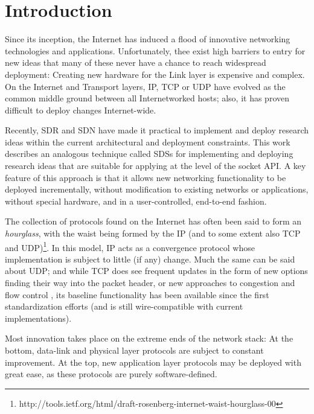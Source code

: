 \section{Introduction}

Since its inception, the Internet has induced a flood of innovative
networking technologies and applications. 
Unfortunately, thee exist high barriers to entry for 
new ideas that many of these never have a chance to reach widespread 
deployment: 
Creating new hardware for the Link layer is expensive and complex. 
On the Internet and Transport layers, \ac{IP}, \ac{TCP} or \ac{UDP} 
have evolved as the common middle ground between all Internetworked hosts; 
also, it has proven difficult to deploy changes Internet-wide.

Recently, \ac{SDR} and \ac{SDN} have made it practical to implement 
and deploy research ideas within the current architectural and 
deployment constraints.
This work describes an analogous technique called 
\acfp{SDS} for implementing and deploying research ideas 
that are suitable for applying at the level of the socket \ac{API}.
A key feature of this approach is that it 
allows new networking functionality to be deployed incrementally,  
without modification to existing networks or applications, 
without special hardware, %
and in a user-controlled, end-to-end fashion.


The collection of protocols found on the Internet has often been
said to form an \textit{hourglass}, with the waist being formed by
the \ac{IP} (and to some extent also \ac{TCP} and
\ac{UDP})\footnote{http://tools.ietf.org/html/draft-rosenberg-internet-waist-hourglass-00}.
In this model, \ac{IP} acts as a convergence protocol whose
implementation is subject to little (if any) change. Much the same
can be said about \ac{UDP}; and while \ac{TCP} does see frequent
updates in the form of new options finding their way into the packet
header, or new approaches to congestion and flow control
\cite{IW10,cubic,more-tcp-cong-ctrl-refs}, its baseline functionality
has been available since the first standardization efforts \cite{rfc793}
(and is still wire-compatible with current implementations).

Most innovation takes place on the extreme ends of the network
stack: At the bottom, data-link and physical layer protocols are
subject to constant improvement. At the top, new application layer
protocols may be deployed with great ease, as these protocols are
purely software-defined.

